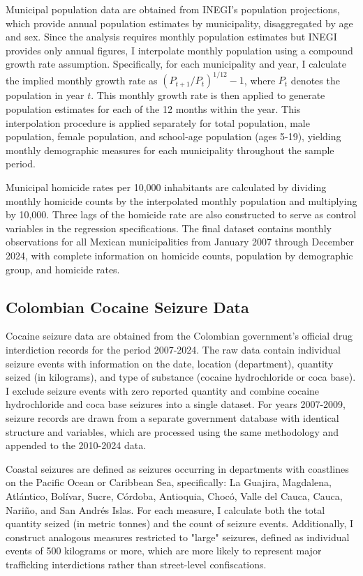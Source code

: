 \documentclass[12pt,letter,english,intoc,bibliography=totoc,index=totoc,BCOR10mm,captions=tableheading,nottitlepage,fleqn]{article}
\theoremstyle{break}
\begin{document}
Municipal population data are obtained from INEGI's population projections, which provide annual population estimates by municipality, disaggregated by age and sex. Since the analysis requires monthly population estimates but INEGI provides only annual figures, I interpolate monthly population using a compound growth rate assumption. Specifically, for each municipality and year, I calculate the implied monthly growth rate as $(P_{t+1}/P_t)^{1/12} - 1$, where $P_t$ denotes the population in year $t$. This monthly growth rate is then applied to generate population estimates for each of the 12 months within the year. This interpolation procedure is applied separately for total population, male population, female population, and school-age population (ages 5-19), yielding monthly demographic measures for each municipality throughout the sample period.

Municipal homicide rates per 10,000 inhabitants are calculated by dividing monthly homicide counts by the interpolated monthly population and multiplying by 10,000. Three lags of the homicide rate are also constructed to serve as control variables in the regression specifications. The final dataset contains monthly observations for all Mexican municipalities from January 2007 through December 2024, with complete information on homicide counts, population by demographic group, and homicide rates.

\subsection{Colombian Cocaine Seizure Data}
Cocaine seizure data are obtained from the Colombian government's official drug interdiction records for the period 2007-2024. The raw data contain individual seizure events with information on the date, location (department), quantity seized (in kilograms), and type of substance (cocaine hydrochloride or coca base). I exclude seizure events with zero reported quantity and combine cocaine hydrochloride and coca base seizures into a single dataset. For years 2007-2009, seizure records are drawn from a separate government database with identical structure and variables, which are processed using the same methodology and appended to the 2010-2024 data.

Coastal seizures are defined as seizures occurring in departments with coastlines on the Pacific Ocean or Caribbean Sea, specifically: La Guajira, Magdalena, Atl\'{a}ntico, Bol\'{i}var, Sucre, C\'{o}rdoba, Antioquia, Choc\'{o}, Valle del Cauca, Cauca, Nari\~{n}o, and San Andr\'{e}s Islas. For each measure, I calculate both the total quantity seized (in metric tonnes) and the count of seizure events. Additionally, I construct analogous measures restricted to "large" seizures, defined as individual events of 500 kilograms or more, which are more likely to represent major trafficking interdictions rather than street-level confiscations.
\end{document}
